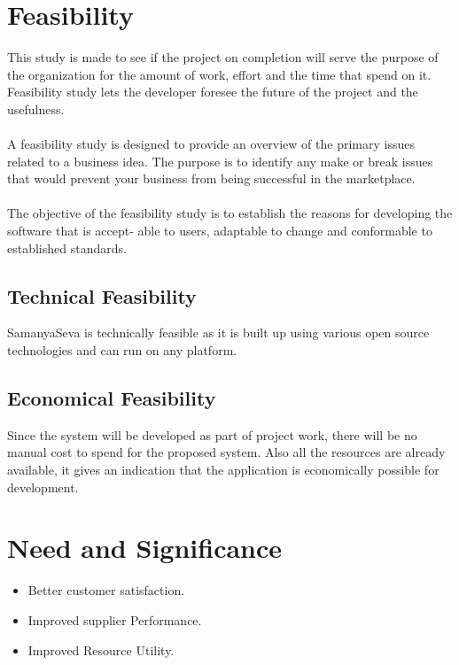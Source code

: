 
\section{Feasibility}
This study is made to see if the project on completion will serve the purpose of the organization for the
amount of work, effort and the time that spend on it. Feasibility study lets the developer foresee the future
of the project and the usefulness.\\\\
A feasibility study is designed to provide an overview of the primary issues related to a business idea. The
purpose is to identify any make or break issues that would prevent your business from being successful
in the marketplace.\\\\
The objective of the feasibility study is to establish the reasons for developing the software that is accept-
able to users, adaptable to change and conformable to established standards.\\

\subsection{Technical Feasibility}
SamanyaSeva is technically feasible as it is built up using various open source technologies and can run on any platform.

\subsection{Economical Feasibility}
Since the system will be developed as part of project work, there will be no manual cost to spend for the proposed system. Also all the resources are already available, it gives an indication that the application is economically possible for development.



\section{Need and Significance}
\begin{itemize}
	\item Better customer satisfaction.
	\item Improved supplier Performance.
	\item Improved Resource Utility.
	\end{itemize}

